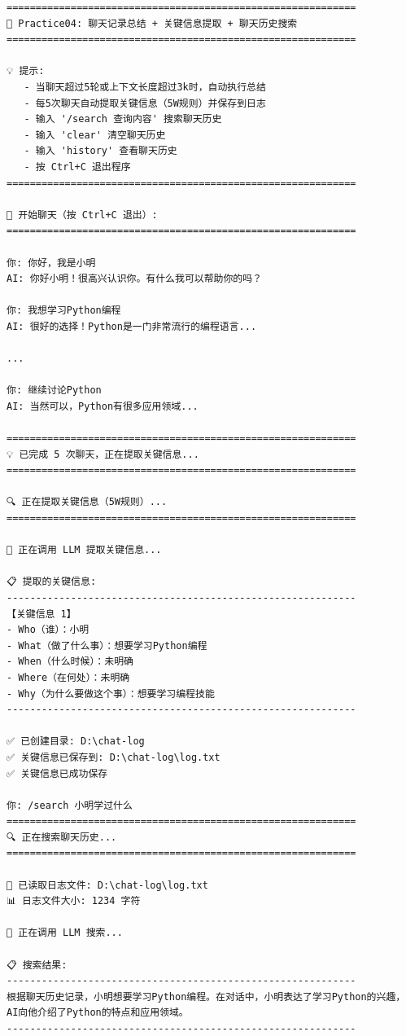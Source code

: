 \documentclass[]{article}
\begin{document}
\begin{verbatim}
============================================================
🚀 Practice04: 聊天记录总结 + 关键信息提取 + 聊天历史搜索
============================================================

💡 提示:
   - 当聊天超过5轮或上下文长度超过3k时，自动执行总结
   - 每5次聊天自动提取关键信息（5W规则）并保存到日志
   - 输入 '/search 查询内容' 搜索聊天历史
   - 输入 'clear' 清空聊天历史
   - 输入 'history' 查看聊天历史
   - 按 Ctrl+C 退出程序
============================================================

💬 开始聊天（按 Ctrl+C 退出）:
============================================================

你: 你好，我是小明
AI: 你好小明！很高兴认识你。有什么我可以帮助你的吗？

你: 我想学习Python编程
AI: 很好的选择！Python是一门非常流行的编程语言...

...

你: 继续讨论Python
AI: 当然可以，Python有很多应用领域...

============================================================
💡 已完成 5 次聊天，正在提取关键信息...
============================================================

🔍 正在提取关键信息（5W规则）...
============================================================

🤖 正在调用 LLM 提取关键信息...

📋 提取的关键信息:
------------------------------------------------------------
【关键信息 1】
- Who（谁）：小明
- What（做了什么事）：想要学习Python编程
- When（什么时候）：未明确
- Where（在何处）：未明确
- Why（为什么要做这个事）：想要学习编程技能
------------------------------------------------------------

✅ 已创建目录: D:\chat-log
✅ 关键信息已保存到: D:\chat-log\log.txt
✅ 关键信息已成功保存

你: /search 小明学过什么
============================================================
🔍 正在搜索聊天历史...
============================================================

📂 已读取日志文件: D:\chat-log\log.txt
📊 日志文件大小: 1234 字符

🤖 正在调用 LLM 搜索...

📋 搜索结果:
------------------------------------------------------------
根据聊天历史记录，小明想要学习Python编程。在对话中，小明表达了学习Python的兴趣，AI向他介绍了Python的特点和应用领域。
------------------------------------------------------------
\end{verbatim}
\end{document}
